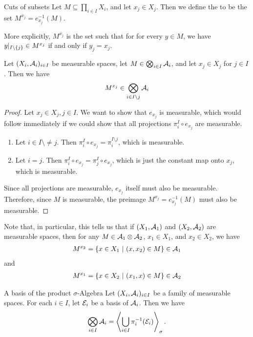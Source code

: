 \begin{importantdefinition}{Cuts of subsets}{}
	Let $M \subseteq \prod_{i \in I} X_i$, and let $x_j \in X_j$. Then we define the  to be the set $M^{x_j} = e_{x_j}^{-1}(M)$. 
\end{importantdefinition}
More explicitly, $M^{x_j}$ is the set such that for for every $y \in M$, we have $y|_{I \setminus \qty{j}} \in M^{x_j}$ if and only if $y_j = x_j$.
\begin{corollary}
	Let $(X_i, \mathcal{A}_i)_{i \in I}$ be measurable spaces, let $M \in \bigotimes_{i \in I} \mathcal{A}_i$, and let  $x_j \in X_j$ for $j \in I$. Then we have
	\begin{align*}
		M^{x_j} \in \bigotimes_{i \in I \setminus j} \mathcal{A}_i
	\end{align*}
\end{corollary}
\begin{proof}
	Let $x_j \in X_j, j \in I$. We want to show that $e_{x_j}$ is measurable, which would follow immediately if we could show that all projections $\pi_i^I \circ e_{x_j}$ are measurable.
	\begin{enumerate}
		\item Let $i \in I \setminus \neq j$. Then $\pi_i^I \circ e_{x_j} = \pi_i^{I \setminus j}$, which is measurable.
		\item Let $i = j$. Then $\pi_i^I \circ e_{x_j} = \pi_j^I \circ e_{x_j}$, which is just the constant map onto $x_j$, which is measurable.
	\end{enumerate}
	Since all projections are measurable, $e_{x_j}$ itself must also be measurable. Therefore, since $M$ is measurable, the preimage $M^{x_j} = e_{x_j}^{-1}(M)$ must also be measurable.
\end{proof}
Note that, in particular, this tells us that if $(X_1, \mathcal{A}_1)$ and $(X_2, \mathcal{A}_2)$ are measurable spaces, then for any $M \in \mathcal{A}_1 \otimes \mathcal{A}_2$, $x_1 \in X_1$, and $x_2 \in X_2$, we have 
\begin{align*}
	M^{x_2} = \qty{x \in X_1 ~\middle|~(x, x_2) \in M} \in \mathcal{A}_1
\end{align*}
and 
\begin{align*}
	M^{x_1} = \qty{x \in X_2 ~\middle|~(x_1, x) \in M} \in \mathcal{A}_2
\end{align*} 
\begin{importanttheorem}{A basis of the product $\sigma$-Algebra}{}
	Let $(X_i, \mathcal{A}_i)_{i \in I}$ be a family of measurable spaces. For each $i \in I$, let $\mathcal{E}_i$ be a basis of $\mathcal{A}_i$. Then we have
	\begin{align*}
		\bigotimes_{i \in I} \mathcal{A}_i = \left\langle \bigcup_{i \in I} \pi_i^{-1}(\mathcal{E}_i) \right\rangle_\sigma.
	\end{align*}
\end{importanttheorem}
